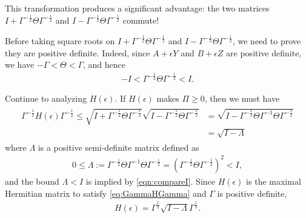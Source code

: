\documentclass{article}
\numberwithin{equation}{section}
\begin{document}
This transformation produces a significant advantage: the two matrices $I + \Gamma^{-\frac{1}{2}} \Theta \Gamma^{-\frac{1}{2}}$ and $I - \Gamma^{-\frac{1}{2}} \Theta \Gamma^{-\frac{1}{2}} $ commute!

Before taking square roots on $I + \Gamma^{-\frac{1}{2}} \Theta \Gamma^{-\frac{1}{2}} $ and $I - \Gamma^{-\frac{1}{2}} \Theta \Gamma^{-\frac{1}{2}} $, we need to prove they are positive definite. Indeed, since $A+\epsilon Y$ and $B+\epsilon Z$ are positive definite, we have $-\Gamma<\Theta<\Gamma$, and hence 
\begin{align}\label{eqn:compareI}
    -I<\Gamma^{-\frac{1}{2}} \Theta \Gamma^{-\frac{1}{2}}<I.
\end{align} 

Continue to analyzing $H(\epsilon).$
If $H(\epsilon)  $ makes $\Pi\geq 0$, then we must have
\begin{align}\label{eq:GammaHGamma}
\begin{split}
\Gamma^{-\frac{1}{2}} H(\epsilon)  \Gamma^{-\frac{1}{2}} \leq \sqrt{I+\Gamma^{-\frac{1}{2}} \Theta \Gamma^{-\frac{1}{2}}} \sqrt{I-\Gamma^{-\frac{1}{2}} \Theta \Gamma^{-\frac{1}{2}}} &= \sqrt{I - \Gamma^{-\frac{1}{2}} \Theta \Gamma^{-1} \Theta \Gamma^{-\frac{1}{2}}} \\
&= \sqrt{I - \Lambda}
\end{split}
\end{align}
where $\Lambda$ is a positive semi-definite matrix defined as 
\begin{align}\label{eq:sizeZ}
    0\leq \Lambda:=\Gamma^{-\frac{1}{2}} \Theta \Gamma^{-1} \Theta \Gamma^{-\frac{1}{2}}=(\Gamma^{-\frac{1}{2}} \Theta \Gamma^{-\frac{1}{2}})^2<I,
\end{align} and the bound $ \Lambda< I$ is implied by \eqref{eqn:compareI}.
Since $H(\epsilon)$ is the maximal Hermitian matrix to satisfy \eqref{eq:GammaHGamma} and $\Gamma$ is positive definite,
\begin{align}
   H(\epsilon)   = \Gamma^{\frac{1}{2}} \sqrt{I-\Lambda} \Gamma^{\frac{1}{2}}.
\end{align}
\end{document}
